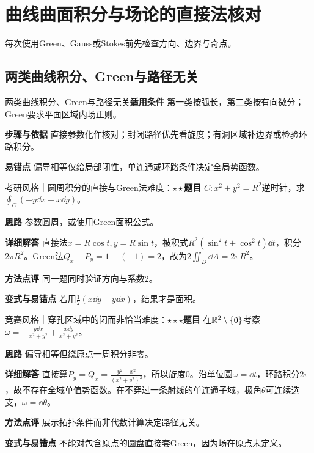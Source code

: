\section{曲线曲面积分与场论的直接法核对}\label{deep:fields_source_deep}

\begin{examtip}每次使用Green、Gauss或Stokes前先检查方向、边界与奇点。\end{examtip}

\subsection{两类曲线积分、Green与路径无关}\label{deep:fields_source_deep:green}

\begin{method}{两类曲线积分、Green与路径无关}\textbf{适用条件} 第一类按弧长，第二类按有向微分；Green要求平面区域内场正则。\par\textbf{步骤与依据} 直接参数化作核对；封闭路径优先看旋度；有洞区域补边界或检验环路积分。\par\textbf{易错点} 偏导相等仅给局部闭性，单连通或环路条件决定全局势函数。\end{method}

\begin{example}{考研风格｜圆周积分的直接与Green法}{难度：$\star\star$}\label{deep:ex:fields_source_deep:greenarea}\textbf{题目} $C:x^2+y^2=R^2$逆时针，求$\oint_C(-y\dd x+x\dd y)$。\par\textbf{思路} 参数圆周，或使用Green面积公式。\par\textbf{详细解答} 直接法$x=R\cos t,y=R\sin t$，被积式$R^2(\sin^2t+\cos^2t)\dd t$，积分$2\pi R^2$。Green法$Q_x-P_y=1-(-1)=2$，故为$2\iint_D\dd A=2\pi R^2$。\par\textbf{方法点评} 同一题同时验证方向与系数2。\par\textbf{变式与易错点} 若用$\frac12(x\dd y-y\dd x)$，结果才是面积。\end{example}

\begin{example}{竞赛风格｜穿孔区域中的闭而非恰当}{难度：$\star\star\star$}\label{deep:ex:fields_source_deep:hole}\textbf{题目} 在$\mathbb{R}^2\setminus\{0\}$考察$\omega=-\frac{y\dd x}{x^2+y^2}+\frac{x\dd y}{x^2+y^2}$。\par\textbf{思路} 偏导相等但绕原点一周积分非零。\par\textbf{详细解答} 直接算$P_y=Q_x=\frac{y^2-x^2}{(x^2+y^2)^2}$，所以旋度0。沿单位圆$\omega=\dd t$，环路积分$2\pi$，故不存在全域单值势函数。在不穿过一条射线的单连通子域，极角$\theta$可连续选支，$\omega=\dd\theta$。\par\textbf{方法点评} 展示拓扑条件而非代数计算决定路径无关。\par\textbf{变式与易错点} 不能对包含原点的圆盘直接套Green，因为场在原点未定义。\end{example}

